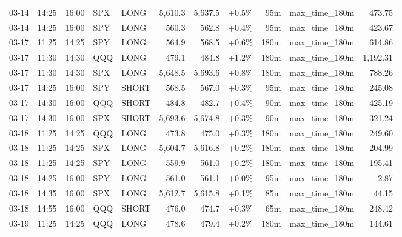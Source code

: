 \documentclass[11pt,a4paper,twoside]{article}
\begin{document}
\begin{center}
\begin{longtable}{>{\color{txtmain}}l l l l l r r r r >{\color{txtmain}}l r}
03-14 & 14:25 & 16:00 & SPX & LONG & 5,610.3 & 5,637.5 & \textcolor{wingreen}{+0.5\%} & 95m & max\_time\_180m & \textcolor{wingreen}{473.75} \\
03-14 & 14:25 & 16:00 & SPY & LONG & 560.3 & 562.8 & \textcolor{wingreen}{+0.4\%} & 95m & max\_time\_180m & \textcolor{wingreen}{423.67} \\
03-17 & 11:25 & 14:25 & SPY & LONG & 564.9 & 568.5 & \textcolor{wingreen}{+0.6\%} & 180m & max\_time\_180m & \textcolor{wingreen}{614.86} \\
03-17 & 11:30 & 14:30 & QQQ & LONG & 479.1 & 484.8 & \textcolor{wingreen}{+1.2\%} & 180m & max\_time\_180m & \textcolor{wingreen}{1,192.31} \\
03-17 & 11:30 & 14:30 & SPX & LONG & 5,648.5 & 5,693.6 & \textcolor{wingreen}{+0.8\%} & 180m & max\_time\_180m & \textcolor{wingreen}{788.26} \\
03-17 & 14:25 & 16:00 & SPY & SHORT & 568.5 & 567.0 & \textcolor{wingreen}{+0.3\%} & 95m & max\_time\_180m & \textcolor{wingreen}{245.08} \\
03-17 & 14:30 & 16:00 & QQQ & SHORT & 484.8 & 482.7 & \textcolor{wingreen}{+0.4\%} & 90m & max\_time\_180m & \textcolor{wingreen}{425.19} \\
03-17 & 14:30 & 16:00 & SPX & SHORT & 5,693.6 & 5,674.8 & \textcolor{wingreen}{+0.3\%} & 90m & max\_time\_180m & \textcolor{wingreen}{321.24} \\
03-18 & 11:25 & 14:25 & QQQ & LONG & 473.8 & 475.0 & \textcolor{wingreen}{+0.3\%} & 180m & max\_time\_180m & \textcolor{wingreen}{249.60} \\
03-18 & 11:25 & 14:25 & SPX & LONG & 5,604.7 & 5,616.8 & \textcolor{wingreen}{+0.2\%} & 180m & max\_time\_180m & \textcolor{wingreen}{204.99} \\
03-18 & 11:25 & 14:25 & SPY & LONG & 559.9 & 561.0 & \textcolor{wingreen}{+0.2\%} & 180m & max\_time\_180m & \textcolor{wingreen}{195.41} \\
03-18 & 14:25 & 16:00 & SPY & LONG & 561.0 & 561.1 & \textcolor{wingreen}{+0.0\%} & 95m & max\_time\_180m & \textcolor{lossred}{-2.87} \\
03-18 & 14:35 & 16:00 & SPX & LONG & 5,612.7 & 5,615.8 & \textcolor{wingreen}{+0.1\%} & 85m & max\_time\_180m & \textcolor{wingreen}{44.15} \\
03-18 & 14:55 & 16:00 & QQQ & SHORT & 476.0 & 474.7 & \textcolor{wingreen}{+0.3\%} & 65m & max\_time\_180m & \textcolor{wingreen}{248.42} \\
03-19 & 11:25 & 14:25 & QQQ & LONG & 478.6 & 479.4 & \textcolor{wingreen}{+0.2\%} & 180m & max\_time\_180m & \textcolor{wingreen}{144.61} \\

\end{longtable}
\end{center}
\end{document}
